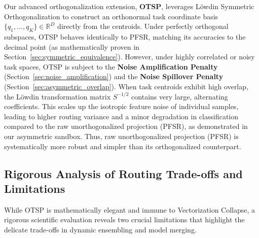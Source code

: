 Our advanced orthogonalization extension, \textbf{OTSP}, leverages L{\"o}wdin Symmetric Orthogonalization to construct an orthonormal task coordinate basis $\{q_1, \dots, q_K\} \in \mathbb{R}^D$ directly from the centroids. Under perfectly orthogonal subspaces, OTSP behaves identically to PFSR, matching its accuracies to the decimal point (as mathematically proven in Section~\ref{sec:symmetric_equivalence}). However, under highly correlated or noisy task spaces, OTSP is subject to the \textbf{Noise Amplification Penalty} (Section~\ref{sec:noise_amplification}) and the \textbf{Noise Spillover Penalty} (Section~\ref{sec:asymmetric_overlap}). When task centroids exhibit high overlap, the L{\"o}wdin transformation matrix $S^{-1/2}$ contains very large, alternating coefficients. This scales up the isotropic feature noise of individual samples, leading to higher routing variance and a minor degradation in classification compared to the raw unorthogonalized projection (PFSR), as demonstrated in our asymmetric sandbox. Thus, raw unorthogonalized projection (PFSR) is systematically more robust and simpler than its orthogonalized counterpart.

\subsection{Rigorous Analysis of Routing Trade-offs and Limitations}
\label{sec:limitations}

While OTSP is mathematically elegant and immune to Vectorization Collapse, a rigorous scientific evaluation reveals two crucial limitations that highlight the delicate trade-offs in dynamic ensembling and model merging.

